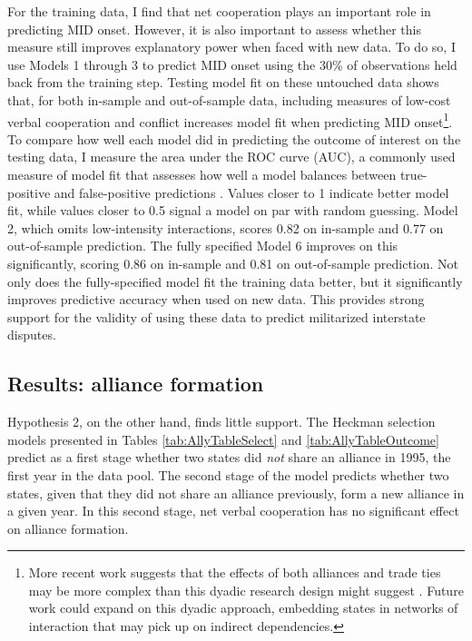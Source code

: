 \documentclass[10pt,]{article}
\begin{document}
For the training data, I find that net cooperation plays an important
role in predicting MID onset. However, it is also important to assess
whether this measure still improves explanatory power when faced with
new data. To do so, I use Models 1 through 3 to predict MID onset using
the 30\% of observations held back from the training step. Testing model
fit on these untouched data shows that, for both in-sample and
out-of-sample data, including measures of low-cost verbal cooperation
and conflict increases model fit when predicting MID onset\footnote{More
  recent work suggests that the effects of both alliances and trade ties
  may be more complex than this dyadic research design might suggest
  \citep[e.g.][]{Oneal2003, Maoz2007}. Future work could expand on this
  dyadic approach, embedding states in networks of interaction that may
  pick up on indirect dependencies.}. To compare how well each model did
in predicting the outcome of interest on the testing data, I measure the
area under the ROC curve (AUC), a commonly used measure of model fit
that assesses how well a model balances between true-positive and
false-positive predictions \citep{Hanley1982}. Values closer to 1
indicate better model fit, while values closer to 0.5 signal a model on
par with random guessing. Model 2, which omits low-intensity
interactions, scores 0.82 on in-sample and 0.77 on out-of-sample
prediction. The fully specified Model 6 improves on this significantly,
scoring 0.86 on in-sample and 0.81 on out-of-sample prediction. Not only
does the fully-specified model fit the training data better, but it
significantly improves predictive accuracy when used on new data. This
provides strong support for the validity of using these data to predict
militarized interstate disputes.

\subsection{Results: alliance
formation}\label{results-alliance-formation}

Hypothesis 2, on the other hand, finds little support. The Heckman
selection models presented in Tables \ref{tab:AllyTableSelect} and
\ref{tab:AllyTableOutcome} predict as a first stage whether two states
did \emph{not} share an alliance in 1995, the first year in the data
pool. The second stage of the model predicts whether two states, given
that they did not share an alliance previously, form a new alliance in a
given year. In this second stage, net verbal cooperation has no
significant effect on alliance formation.
\end{document}
